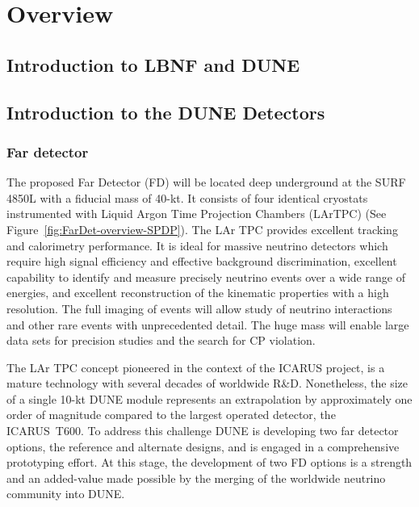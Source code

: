 \chapter{Overview}
\label{ch:detectors-overview}

\section{Introduction to LBNF and DUNE}


\section{Introduction to the DUNE Detectors}
\label{sec:intro-dune-det}

\subsection{Far detector}
\label{sec:intro-dune-far-det}

The proposed Far Detector (FD) will be located deep underground at the
SURF 4850L with a fiducial mass of 40-kt. It consists of four
identical cryostats instrumented with Liquid Argon Time Projection
Chambers (LArTPC) (See Figure~\ref{fig:FarDet-overview-SPDP}). The LAr
TPC provides excellent tracking and calorimetry performance. It is
ideal for massive neutrino detectors which require high signal
efficiency and effective background discrimination, excellent
capability to identify and measure precisely neutrino events over a
wide range of energies, and excellent reconstruction of the kinematic
properties with a high resolution. The full imaging of events will
allow study of neutrino interactions and other rare events with
unprecedented detail. The huge mass will enable large data sets for
precision studies and the search for CP violation.

The LAr TPC concept pioneered in the context of the ICARUS project, is
a mature technology with several decades of worldwide R\&D.
Nonetheless, the size of a single 10-kt DUNE module represents an
extrapolation by approximately one order of magnitude compared to the
largest operated detector, the ICARUS~T600. To address this challenge
DUNE is developing two far detector options, the reference and
alternate designs, and is engaged in a comprehensive prototyping
effort. At this stage, the development of two FD options is a strength
and an added-value made possible by the merging of the worldwide
neutrino community into DUNE.

